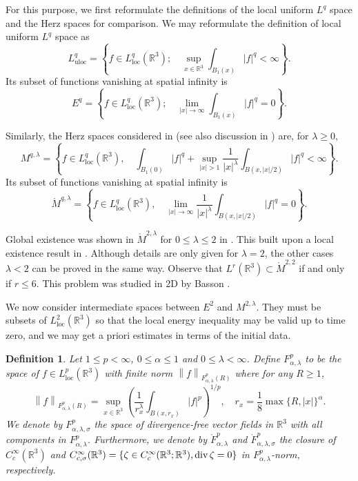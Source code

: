 \documentclass[11pt]{article}
\numberwithin{equation}{section}
\newtheorem{defn}[thm]{Definition}
\theoremstyle{remark}
\theoremstyle{definition}
\newcommand{\bke}[1]{\left ( #1 \right )}
\newcommand{\bket}[1]{\left \{ #1 \right \}}
\newcommand{\norm}[1]{\left \| #1 \right \|}
\newcommand{\R}{\mathbb{R}}
\renewcommand{\div}{\mathop{\rm div}\nolimits}
\newcommand{\si}{\sigma}
\newcommand\al{\alpha}
\newcommand\la{\lambda}
\newcommand{\EQ}[1]{\begin{equation} #1 \end{equation}}
\newcommand{\uloc}{{\mathrm{uloc}}}
\newcommand{\loc}{{\mathrm{loc}}}
\newcommand{\BKT}{\mathring M^{2,2}}
\begin{document}
For this purpose, we first reformulate the definitions of the local uniform $L^q$ space and the Herz spaces for comparison.
We may reformulate the definition of local uniform $L^q$ space as
\EQ{
L^q_\uloc=\bket{
f\in L^q_\loc(\R^3); \quad
\sup_{x\in \R^3} \int_{B_1(x)} |f|^q <\infty}.
}
Its subset of functions vanishing at spatial infinity is
\EQ{
E^q=\bket{
f\in L^q_\loc(\R^3); \quad
\lim_{|x|\to \infty} \int_{B_1(x)} |f|^q =0}.
}

Similarly, the Herz spaces considered in \cite{BKT} (see also discussion in \cite{FDLR2}) are, for $\la\ge 0$,
\EQ{\label{Mpq}
M^{q,\lambda} =\bket{ f\in L^q_\loc(\R^3), \quad {\int_{B_1(0)}|f|^q }+
\sup_{|x|>1}  \frac1{|x|^\la}\int_{B(x,  |x|/2)}|f|^q <\infty}.
}
Its subset of functions vanishing at spatial infinity is
\EQ{\label{Mpqring}
\mathring M^{q,\lambda} =\bket{  f\in L^q_\loc(\R^3), \quad
\lim_{|x|\to \infty} \frac1{|x|^\la}\int_{B(x,  |x|/2)}|f|^q =0}.
}


Global existence was shown in $\mathring M^{2,\lambda}$ for $0\le \la \le 2$ in \cite{BKT}. This built upon a local existence result in \cite{BK}. Although details are only given for $\la=2$, the other cases $\la<2$ can be proved in the same way. Observe that $L^r(\R^3)\subset \BKT$ if and only if $r \le 6$. This problem was studied in 2D by Basson \cite{Basson}.
%

%
%
%
%
%
%
%
%
%
%
%
%
%
%
%
%
%
%
%
%
%
%
%
%
%
%

%
We now consider intermediate spaces between $E^2$ and $M^{2,\lambda}$. They
must be subsets of $L^2_\loc(\R^3)$ so that the local energy inequality may be valid up to time zero, and we may get a priori estimates in terms of the initial data.

\begin{defn}\label{Fpalla.def}
Let $1\le p<\infty$,
 $0\le \al \le 1$ and $0\le \la<\infty$. Define $F^p_{\al,\la}$ to be the space of $f\in L^p_\loc(\R^3)$ with finite norm $\norm{f}_{F^p_{\al,\la}(R)}$ where for any $R\ge 1$,
\EQ{\label{Fal.def}
\norm{f}_{F^p_{\al,\la}(R)} = \sup_{x\in\R^3} \bke{\frac1{r_x^\la}\int_{B(x, r_x)} |f|^p }^{1/p}, \quad r_x =\frac 1 8\max\{R,|x|\}^\al.
}
We denote by
 $F^p_{\al,\la,\si}$ the space of divergence-free vector fields in $\R^3$ with all components in $F^p_{\al,\la}$.
Furthermore, we denote by
$\mathring F^p_{\al,\la}$ and $\mathring F^p_{\al,\la,\si}$
the closure of $C^\infty_c(\R^3)$ and $C^\infty_{c,\si}(\R^3)=\{ \zeta\in C^\infty_c(\R^3;\R^3), \div \zeta=0\}$ in $F^p_{\al,\la}$-norm, respectively.
\end{defn}
\end{document}
